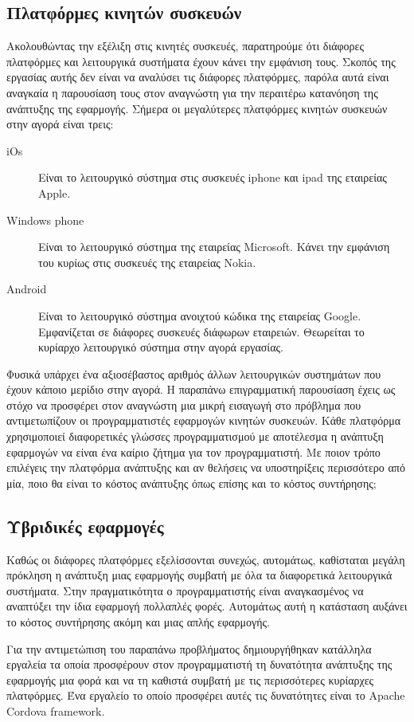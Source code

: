 \subsection{Πλατφόρμες κινητών συσκευών}
Ακολουθώντας την εξέλιξη στις κινητές συσκευές, παρατηρούμε ότι διάφορες πλατφόρμες και λειτουργικά συστήματα έχουν κάνει την εμφάνιση τους. Σκοπός της εργασίας αυτής δεν είναι να αναλύσει τις διάφορες πλατφόρμες, παρόλα αυτά είναι αναγκαία η παρουσίαση τους στον αναγνώστη για την περαιτέρω κατανόηση της ανάπτυξης της εφαρμογής. Σήμερα οι μεγαλύτερες πλατφόρμες κινητών συσκευών στην αγορά είναι τρεις:

\begin{description}
\item [iOs] Είναι το λειτουργικό σύστημα στις συσκευές iphone και ipad της εταιρείας Apple.

\item [Windows phone] Είναι το λειτουργικό σύστημα της εταιρείας Microsoft. Κάνει την εμφάνιση του κυρίως στις συσκευές της εταιρείας Nokia.

\item [Android] Είναι το λειτουργικό σύστημα ανοιχτού κώδικα της εταιρείας Google. Εμφανίζεται σε διάφορες συσκευές διάφωρων εταιρειών. Θεωρείται το κυρίαρχο λειτουργικό σύστημα στην αγορά εργασίας.
\end{description}

\par
Φυσικά υπάρχει ένα αξιοσέβαστος αριθμός άλλων λειτουργικών συστημάτων που έχουν κάποιο μερίδιο στην αγορά. Η παραπάνω επιγραμματική παρουσίαση έχεις ως στόχο να προσφέρει στον αναγνώστη μια μικρή εισαγωγή στο πρόβλημα που αντιμετωπίζουν οι προγραμματιστές εφαρμογών κινητών συσκευών. Κάθε πλατφόρμα χρησιμοποιεί διαφορετικές γλώσσες προγραμματισμού με αποτέλεσμα η ανάπτυξη εφαρμογών να είναι ένα καίριο ζήτημα για τον προγραμματιστή. Με ποιον τρόπο επιλέγεις την πλατφόρμα ανάπτυξης και αν θελήσεις να υποστηρίξεις περισσότερο από μία, ποιο θα είναι το κόστος ανάπτυξης όπως επίσης και το κόστος συντήρησης;

\subsection{Υβριδικές εφαρμογές}
Καθώς οι διάφορες πλατφόρμες εξελίσσονται συνεχώς, αυτομάτως, καθίσταται μεγάλη πρόκληση η ανάπτυξη μιας εφαρμογής συμβατή με όλα τα διαφορετικά λειτουργικά συστήματα. Στην πραγματικότητα ο προγραμματιστής είναι αναγκασμένος να αναπτύξει την ίδια εφαρμογή πολλαπλές φορές. Αυτομάτως αυτή η κατάσταση αυξάνει το κόστος συντήρησης ακόμη και μιας απλής εφαρμογής.
\par 
Για την αντιμετώπιση του παραπάνω προβλήματος δημιουργήθηκαν κατάλληλα εργαλεία τα οποία προσφέρουν στον προγραμματιστή τη δυνατότητα ανάπτυξης της εφαρμογής μια φορά και να τη καθιστά συμβατή με τις περισσότερες κυρίαρχες πλατφόρμες. Ένα εργαλείο το οποίο προσφέρει αυτές τις δυνατότητες είναι το Apache Cordova framework. 


